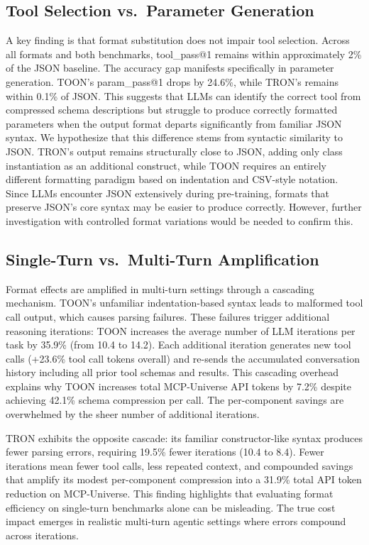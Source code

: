 \documentclass[11pt]{article}
\begin{document}
\subsection{Tool Selection vs.\ Parameter Generation}

A key finding is that format substitution does not impair tool selection. Across all formats and both benchmarks, tool\_pass@1 remains within approximately 2\% of the JSON baseline. The accuracy gap manifests specifically in parameter generation. TOON's param\_pass@1 drops by 24.6\%, while TRON's remains within 0.1\% of JSON. This suggests that LLMs can identify the correct tool from compressed schema descriptions but struggle to produce correctly formatted parameters when the output format departs significantly from familiar JSON syntax. We hypothesize that this difference stems from syntactic similarity to JSON. TRON's output remains structurally close to JSON, adding only class instantiation as an additional construct, while TOON requires an entirely different formatting paradigm based on indentation and CSV-style notation. Since LLMs encounter JSON extensively during pre-training, formats that preserve JSON's core syntax may be easier to produce correctly. However, further investigation with controlled format variations would be needed to confirm this.

\subsection{Single-Turn vs.\ Multi-Turn Amplification}

Format effects are amplified in multi-turn settings through a cascading mechanism. TOON's unfamiliar indentation-based syntax leads to malformed tool call output, which causes parsing failures. These failures trigger additional reasoning iterations: TOON increases the average number of LLM iterations per task by 35.9\% (from 10.4 to 14.2). Each additional iteration generates new tool calls (+23.6\% tool call tokens overall) and re-sends the accumulated conversation history including all prior tool schemas and results. This cascading overhead explains why TOON increases total MCP-Universe API tokens by 7.2\% despite achieving 42.1\% schema compression per call. The per-component savings are overwhelmed by the sheer number of additional iterations.

TRON exhibits the opposite cascade: its familiar constructor-like syntax produces fewer parsing errors, requiring 19.5\% fewer iterations (10.4 to 8.4). Fewer iterations mean fewer tool calls, less repeated context, and compounded savings that amplify its modest per-component compression into a 31.9\% total API token reduction on MCP-Universe. This finding highlights that evaluating format efficiency on single-turn benchmarks alone can be misleading. The true cost impact emerges in realistic multi-turn agentic settings where errors compound across iterations.
\end{document}
